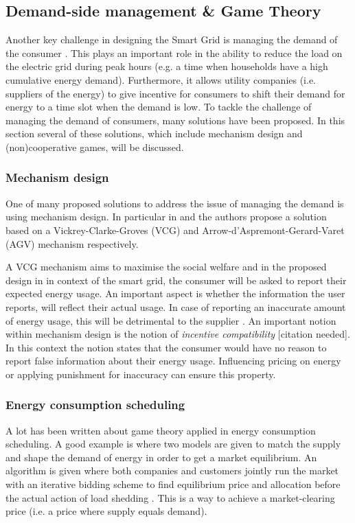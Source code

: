 \subsection{Demand-side management \& Game Theory}
Another key challenge in designing the Smart Grid is managing the demand of the consumer \cite{keypaper}. This plays an important role in the ability to reduce the load on the electric grid during peak hours (e.g. a time when households have a high cumulative energy demand). Furthermore, it allows utility companies (i.e. suppliers of the energy) to give incentive for consumers to shift their demand for energy to a time slot when the demand is low.  To tackle the challenge of managing the demand of consumers, many solutions have been proposed. In this section several of these solutions, which include mechanism design and (non)cooperative games, will be discussed. 

\subsubsection{Mechanism design}
One of many proposed solutions to address the issue of managing the demand is using mechanism design. In particular in \cite{SamadiMohsenian-RadSchoberEtAl2012} and \cite{MaDengSongEtAl2014} the authors propose a solution based on a Vickrey-Clarke-Groves (VCG) and Arrow-d'Aspremont-Gerard-Varet (AGV) mechanism respectively.

A VCG mechanism aims to maximise the social welfare \cite{ShohamLeyton-Brown2008} and in the proposed design in \cite{SamadiMohsenian-RadSchoberEtAl2012} in context of the smart grid, the consumer will be asked to report their expected energy usage. An important aspect is whether the information the user reports, will reflect their actual usage. In case of reporting an inaccurate amount of energy usage, this will be detrimental to the supplier \cite{MaDengSongEtAl2014}. An important notion within mechanism design is the notion of \textit{incentive compatibility} [citation needed]. In this context the notion states that the consumer would have no reason to report false information about their energy usage. Influencing pricing on energy \cite{SamadiMohsenian-RadSchoberEtAl2012} or applying punishment for inaccuracy \cite{MaDengSongEtAl2014} can ensure this property.

\subsubsection{Energy consumption scheduling}
A lot has been written about game theory applied in energy consumption scheduling. A good example is \cite{ChenLiLowEtAl2010} where two models are given to match the supply and shape the demand of energy in order to get a market equilibrium. An algorithm is given where both companies and customers jointly run the market with an iterative bidding scheme to find equilibrium price and allocation before the actual action of load shedding \cite{ChenLiLowEtAl2010}. This is a way to achieve a market-clearing price (i.e. a price where supply equals demand).

